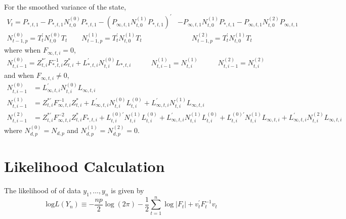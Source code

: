 \documentclass[12pt]{article}
\newcommand{\Cov}[0]{\text{Cov}}
\newcommand{\Var}[0]{\text{Var}}
\newcommand{\flag}[0]{red}
\begin{document}
	For the smoothed variance of the state, 
	\begin{align*}
	V_t = P_{*,t,1} - P_{*,t,1} N_{t,0}^{(0)} P_{*,t,1} - \left(P_{\infty,t,1} N_{t,0}^{(1)} P_{*,t,1} \right)^\prime &- P_{\infty,t,1} N_{t,0}^{(1)} P_{*,t,1} - P_{\infty,t,1} N_{t,0}^{(2)} P_{\infty,t,1} \\
	N_{t-1,p}^{(0)} = T_t^\prime N_{t,0}^{(0)} T_t \qquad
	N_{t-1,p}^{(1)} = T_t^\prime N_{t,0}^{(1)} T_t &\qquad
	N_{t-1,p}^{(2)} = T_t^\prime N_{t,0}^{(1)} T_t 
	\end{align*}
	where when $F_{\infty,t,i} = 0$, 
	\begin{align*}
	N_{t,i-1}^{(0)} = Z_{t,i}^{*\prime} F_{*,t,i}^{-1} Z_{t,i}^* + L_{*,t,i}^\prime N_{t,i}^{(0)} L_{*,t,i} &\qquad
	N_{t,i-1}^{(1)} = N_{t,i}^{(1)} &\qquad
	N_{t,i-1}^{(2)} = N_{t,i}^{(2)} 
	\end{align*}
	and when $F_{\infty,t,i} \neq 0$,
	\begin{align*}
	N_{t,i-1}^{(0)} &= L_{\infty,t,i}^\prime N_{t,i}^{(0)} L_{\infty,t,i}\\
	N_{t,i-1}^{(1)} &= Z_{t,i}^{*\prime} F_{\infty,t,i}^{-1} Z_{t,i}^* + L_{\infty,t,i}^\prime N_{t,i}^{(0)} L_{t,i}^{(0)} + L_{\infty,t,i}^\prime N_{t,i}^{(1)} L_{\infty,t,i}  \\
	N_{t,i-1}^{(2)} &= Z_{t,i}^{*\prime} F_{\infty,t,i}^{-2} Z_{t,i}^* F_{*,t,i} + L_{t,i}^{(0)\prime} N_{t,i}^{(1)} L_{t,i}^{(0)} + L_{\infty,t,i}^\prime N_{t,i}^{(1)} L_{t,i}^{(0)} + L_{t,i}^{(0)\prime} N_{t,i}^{(1)} L_{\infty,t,i} + L_{\infty,t,i}^\prime N_{t,i}^{(2)} L_{\infty,t,i}
	\end{align*}
	where $N_{d,p}^{(0)} = N_{d,p}$ and $N_{d,p}^{(1)} = N_{d,p}^{(2)} = 0$. \\



\newpage
\section*{Likelihood Calculation}
	The likelihood of of data $y_1, \dots, y_n$ is given by
	\begin{equation*} 
	\text{log} L(Y_n) \equiv -\frac{np}{2} \log(2\pi) - \frac{1}{2}  \sum_{t=1}^n \log|F_t| + v_t^\prime F_t^{-1}v_t
	\end{equation*}
\end{document}
